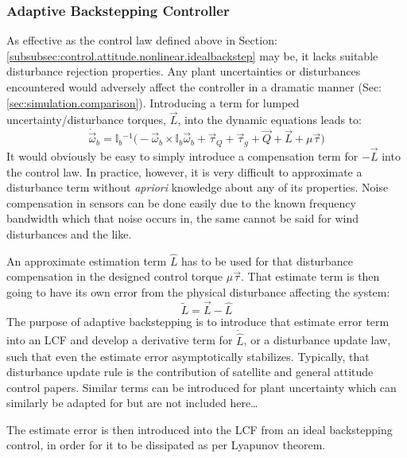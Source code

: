 {\subsubsection{Adaptive Backstepping Controller}
\label{subsubsec:control.attitude.nonlinear.adaptivebackstep}
As effective as the control law defined above in Section:\ref{subsubsec:control.attitude.nonlinear.idealbackstep} may be, it lacks suitable disturbance rejection properties. Any plant uncertainties or disturbances encountered would adversely affect the controller in a dramatic manner (Sec:\ref{sec:simulation.comparison}). Introducing a term for lumped uncertainty/disturbance torques, $\vec{L}$, into the dynamic equations leads to:
\begin{equation}
\dot{\vec{\omega}}_b=\mathbb{I}_b\text{}^{-1}\big(-\vec{\omega}_b\times\mathbb{I}_b\vec{\omega}_b+\vec{\tau}_Q+\vec{\tau}_g+\vec{Q}+\vec{L}+\mu\vec{\tau}\big)
\end{equation}
It would obviously be easy to simply introduce a compensation term for $-\vec{L}$ into the control law. In practice, however, it is very difficult to approximate a disturbance term without \emph{apriori} knowledge about any of its properties. Noise compensation in sensors can be done easily due to the known frequency bandwidth which that noise occurs in, the same cannot be said for wind disturbances and the like.
\par
An approximate estimation term $\hat{L}$ has to be used for that disturbance compensation in the designed control torque $\mu\vec{\tau}$. That estimate term is then going to have its own error from the physical disturbance affecting the system:
\begin{equation}\label{eq:estimate-error}
\widetilde{L}=\vec{L}-\hat{L}
\end{equation}
The purpose of adaptive backstepping is to introduce that estimate error term into an LCF and develop a derivative term for $\dot{\hat{L}}$, or a disturbance update law, such that even the estimate error asymptotically stabilizes. Typically, that disturbance update rule is the contribution of satellite and general attitude control papers. Similar terms can be introduced for plant uncertainty which can similarly be adapted for but are not included here\ldots
\par
The estimate error is then introduced into the LCF from an ideal backstepping control, in order for it to be dissipated as per Lyapunov theorem.
\begin{subequations}

\end{subequations}}
